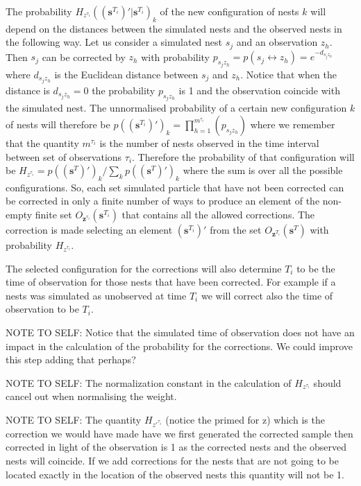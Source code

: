 \documentclass[11pt,a4paper]{article}
\renewcommand{\vec}[1]{\mathbf{#1}}
\begin{document}
{The probability $H_{z^{\tau_i}}((\vec{s}^{T_i})' | \vec{s}^{T_i})_k$ of the new configuration of nests $k$ will depend on the distances between the simulated nests and the observed nests in the following way. Let us consider a simulated nest $s_j$ and an observation $z_h$. Then $s_j$ can be corrected by $z_h$ with probability $p_{s_j z_h} = p(s_j \leftrightarrow z_h) = e^{-d_{s_j z_h}}$ where $d_{s_j z_h}$ is the Euclidean distance between $s_j$ and $z_h$. Notice that when the distance is $d_{s_j z_h} = 0$ the probability $p_{s_j z_h}$ is 1 and the observation coincide with the simulated nest. The unnormalised probability of a certain new configuration $k$ of nests will therefore be $p((\vec{s}^{T_i})')_k = \prod_{h = 1}^{m^{\tau_i}} (p_{s_j z_h})$ where we remember that the quantity $m^{\tau_i}$ is the number of nests observed in the time interval between set of observations $\tau_i$. Therefore the probability of that configuration will be $H_{z^{\tau_i}} = p((\vec{s}^T)')_k / \sum_k p((\vec{s}^T)')_k $ where the sum is over all the possible configurations. So, each set simulated particle that have not been corrected can be corrected in only a finite number of ways to produce an element of the non-empty finite set $O_{\vec{z}^{\tau_i}} (\vec{s}^{T_i})$ that contains all the allowed corrections. The correction is made selecting an element $(\vec{s}^{T_i})'$ from the set $O_{\vec{z}^{T_i}} (\vec{s}^T)$ with probability $H_{z^{\tau_i}}$.

The selected configuration for the corrections will also determine $T_i$ to be the time of observation for those nests that have been corrected. For example if a nests was simulated as unobserved at time $T_i$ we will correct also the time of observation to be $T_i$. 

NOTE TO SELF: Notice that the simulated time of observation does not have an impact in the calculation of the probability for the corrections. We could improve this step adding that perhaps?

NOTE TO SELF: The normalization constant in the calculation of $H_{z^{\tau_i}}$ should cancel out when normalising the weight. 

NOTE TO SELF: The quantity $H_{z'^{\tau_i}}$ (notice the primed for z) which is the correction we would have made have we first generated the corrected sample then corrected in light of the observation is 1 as the corrected nests and the observed nests will coincide. If we add corrections for the nests that are not going to be located exactly in the location of the observed nests this quantity will not be 1.
}
\end{document}
